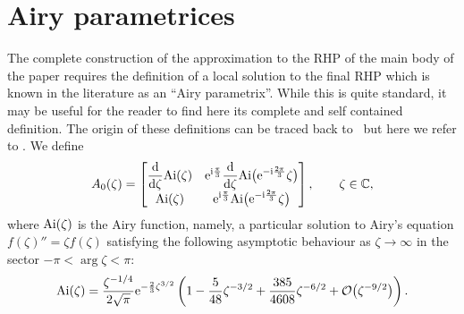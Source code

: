 \documentclass[pdftex]{sigma}
\numberwithin{equation}{section}
\theoremstyle{definition}
\def \d{{\mathrm d}}
\begin{document}
\section{Airy parametrices}\label{app1}
The complete construction of the approximation to the RHP of the main body of the paper requires the definition of a local solution to the final RHP which is known in the literature as an ``Airy parametrix''. While this is quite standard, it may be useful for the reader to find here its complete and self contained definition. The origin of these definitions can be traced back to~\cite{DKMVZ} but here we refer to \cite[Appendix~A]{BertolaBothner}.
We define\vspace{-1mm}
\[%
	A_0(\zeta) = \begin{bmatrix}
	\displaystyle\frac{\d}{\d\zeta}\textnormal{Ai}(\zeta) &\displaystyle {\rm e}^{{\rm i}\frac{\pi}{3}}\frac{\d}{\d\zeta}\textnormal{Ai}\bigl({\rm e}^{-{\rm i}\frac{2\pi}{3}}\zeta\bigr) \\
	\textnormal{Ai}(\zeta) & \displaystyle {\rm e}^{{\rm i}\frac{\pi}{3}}\textnormal{Ai}\bigl({\rm e}^{-{\rm i}\frac{2\pi}{3}}\zeta\bigr)\\
	\end{bmatrix},\qquad\zeta\in\mathbb{C},\vspace{-1mm}
\]
where $\textnormal{Ai}(\zeta)$ is the Airy function, namely, a particular solution to Airy's equation
$f(\zeta)''=\zeta f(\zeta)$
satisfying the following asymptotic behaviour as $\zeta\rightarrow\infty$ in the sector $-\pi<\operatorname{arg} \zeta<\pi$:\vspace{-1mm}
\begin{equation*}
	\textnormal{Ai}(\zeta) = \frac{\zeta^{-1/4}}{2\sqrt{\pi}}{\rm e}^{-\frac{2}{3}\zeta^{3/2}}\left(1-\frac{5}{48}\zeta^{-3/2}+\frac{385}{4608}\zeta^{-6/2}+\mathcal O\bigl(\zeta^{-9/2}\bigr)\right).\vspace{-1mm}
\end{equation*}
\end{document}
